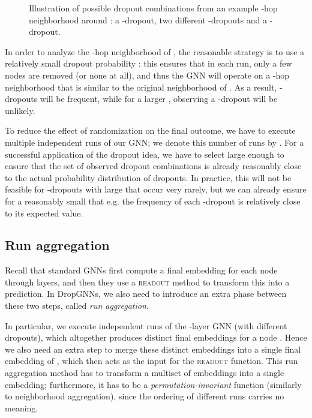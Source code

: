 \documentclass{article}
\begin{document}
\begin{figure}
{ }
\caption{Illustration of  possible dropout combinations from an example -hop neighborhood around : a -dropout, two different -dropouts and a -dropout.}
\label{fig:dropouts}
\end{figure}

In order to analyze the -hop neighborhood of , the reasonable strategy is to use a relatively small dropout probability : this ensures that in each run, only a few nodes are removed (or none at all), and thus the GNN will operate on a -hop neighborhood that is similar to the original neighborhood of . As a result, -dropouts will be frequent, while for a larger , observing a -dropout will be unlikely.

To reduce the effect of randomization on the final outcome, we have to execute multiple independent runs of our GNN; we denote this number of runs by . For a successful application of the dropout idea, we have to select  large enough to ensure that the set of observed dropout combinations is already reasonably close to the actual probability distribution of dropouts. In practice, this will not be feasible for -dropouts with large  that occur very rarely, but we can already ensure for a reasonably small  that e.g. the frequency of each -dropout is relatively close to its expected value.

\subsection{Run aggregation}

Recall that standard GNNs first compute a final embedding for each node through  layers, and then they use a \textsc{readout} method to transform this into a prediction. In DropGNNs, we also need to introduce an extra phase between these two steps, called \textit{run aggregation}.

In particular, we execute  independent runs of the -layer GNN (with different dropouts), which altogether produces  distinct final embeddings for a node . Hence we also need an extra step to merge these  distinct embeddings into a single final embedding of , which then acts as the input for the \textsc{readout} function. This run aggregation method has to transform a multiset of embeddings into a single embedding; furthermore, it has to be a \textit{permutation-invariant} function (similarly to neighborhood aggregation), since the ordering of different runs carries no meaning.
\end{document}
